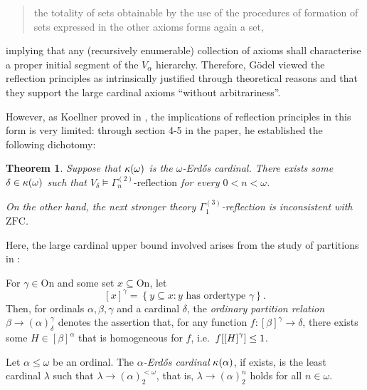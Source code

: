 \documentclass[12pt]{article}
\theoremstyle{plain}
\newtheorem{theorem}{Theorem}[section]
\theoremstyle{definition}
\newcommand{\ZFC}{\mathrm{ZFC}}
\newcommand{\On}{\mathrm{On}}
\begin{document}
\begin{quote}
	the totality of sets obtainable by the use of the procedures of formation of sets expressed in the other axioms forms again a set,
\end{quote}

implying that any (recursively enumerable) collection of axioms shall characterise a proper initial segment of the $V_\alpha$ hierarchy. Therefore, G\"odel viewed the reflection principles as intrinsically justified through theoretical reasons and that they support the large cardinal axioms ``without arbitrariness''.

However, as Koellner proved in \cite{reflection-principles}, the implications of reflection principles in this form is very limited: through section 4-5 in the paper, he established the following dichotomy:

\begin{theorem}
	Suppose that $\kappa\mleft(\omega\mright)$ is the $\omega$-Erd\H{o}s cardinal. There exists some $\delta \in \kappa\mleft(\omega\mright)$ such that $V_\delta \vDash \text{$\Gamma^{(2)}_n$-reflection}$ for every $0 < n < \omega$.

	On the other hand, the next stronger theory $\Gamma^{(3)}_1$-reflection is inconsistent with $\ZFC$.
\end{theorem}

Here, the large cardinal upper bound involved arises from the study of partitions in \cite{partition-calculus}:

\begin{definition}
	For $\gamma \in \On$ and some set $x \subseteq \On$, let
	\[\left[x\right]^\gamma = \left\{y \subseteq x : \text{$y$ has ordertype $\gamma$}\right\}.\]
	Then, for ordinals $\alpha, \beta, \gamma$ and a cardinal $\delta$, the \emph{ordinary partition relation} $\beta \rightarrow \left(\alpha\right)^\gamma_\delta$ denotes the assertion that, for any function $f : \left[\beta\right]^\gamma \rightarrow \delta$, there exists some $H \in \left[\beta\right]^\alpha$ that is homogeneous for $f$, i.e.\ $f\mleft[\left[H\right]^\gamma\mright] \leq 1$.
\end{definition}

\begin{definition}
	Let $\alpha \leq \omega$ be an ordinal. The \emph{$\alpha$-Erd\H{o}s cardinal} $\kappa\mleft(\alpha\mright)$, if exists, is the least cardinal $\lambda$ such that $\lambda \rightarrow \left(\alpha\right)^{<\omega}_2$, that is, $\lambda \rightarrow \left(\alpha\right)^n_2$ holds for all $n \in \omega$.
\end{definition}
\end{document}
